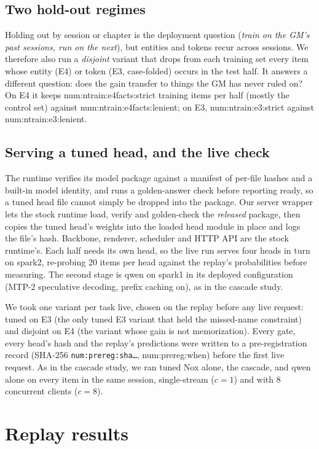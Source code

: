 \documentclass[11pt]{article}
\newcommand{\N}[1]{\csname num:#1\endcsname}
\begin{document}
\subsection{Two hold-out regimes}
Holding out by session or chapter is the deployment question (\emph{train on the GM's past
sessions, run on the next}), but entities and tokens recur across sessions. We therefore also run a
\emph{disjoint} variant that drops from each training set every item whose entity (E4) or token
(E3, case-folded) occurs in the test half. It answers a different question: does the gain transfer
to things the GM has never ruled on? On E4 it keeps \N{ntrain:e4facts:strict} training items per
half (mostly the control set) against \N{ntrain:e4facts:lenient}; on E3,
\N{ntrain:e3:strict} against \N{ntrain:e3:lenient}.

\subsection{Serving a tuned head, and the live check}
The runtime verifies its model package against a manifest of per-file hashes and a built-in model
identity, and runs a golden-answer check before reporting ready, so a tuned head file cannot simply
be dropped into the package. Our server wrapper lets the stock runtime load, verify and golden-check
the \emph{released} package, then copies the tuned head's weights into the loaded head module in
place and logs the file's hash. Backbone, renderer, scheduler and HTTP API are the stock runtime's.
Each half needs its own head, so the live run serves four heads in turn on spark2, re-probing 20
items per head against the replay's probabilities before measuring. The second stage is qwen on
spark1 in its deployed configuration (MTP-2 speculative decoding, prefix caching on), as in the
cascade study.

We took one variant per task live, chosen on the replay before any live request: tuned on E3
(the only tuned E3 variant that held the missed-name constraint) and disjoint on E4 (the variant
whose gain is not memorization). Every gate, every head's hash and the replay's predictions were
written to a pre-registration record (SHA-256 \texttt{\N{prereg:sha}\ldots}, \N{prereg:when}) before
the first live request. As in the cascade study, we ran tuned Nox alone, the cascade, and qwen alone
on every item in the same session, single-stream ($c=1$) and with 8 concurrent clients ($c=8$).

\section{Replay results}
\end{document}
